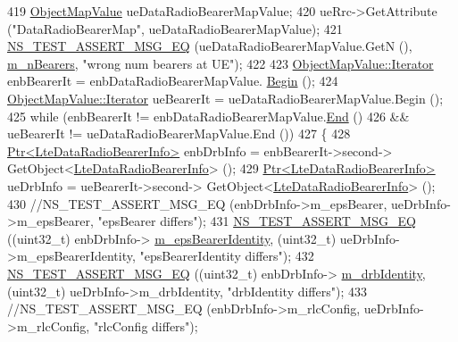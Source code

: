 \begin{DoxyCode}
419           \hyperlink{classns3_1_1ObjectPtrContainerValue}{ObjectMapValue} ueDataRadioBearerMapValue;
420           ueRrc->GetAttribute (\textcolor{stringliteral}{"DataRadioBearerMap"}, ueDataRadioBearerMapValue);
421           \hyperlink{group__testing_ga2a9d78cffb3db8e867c35fff0b698cf5}{NS\_TEST\_ASSERT\_MSG\_EQ} (ueDataRadioBearerMapValue.GetN (), 
      \hyperlink{classLteRrcConnectionEstablishmentTestCase_aed8d1feb0c1b557cd6685b17f3fa39f9}{m\_nBearers}, \textcolor{stringliteral}{"wrong num bearers at UE"});
422 
423           \hyperlink{classns3_1_1ObjectPtrContainerValue_a1f0661f9cf3626d62a4623f36b672876}{ObjectMapValue::Iterator} enbBearerIt = enbDataRadioBearerMapValue.
      \hyperlink{classns3_1_1ObjectPtrContainerValue_a2dd05c2e7483eb2eeeb0b2389f238815}{Begin} ();
424           \hyperlink{classns3_1_1ObjectPtrContainerValue_a1f0661f9cf3626d62a4623f36b672876}{ObjectMapValue::Iterator} ueBearerIt = ueDataRadioBearerMapValue.Begin ();
425           \textcolor{keywordflow}{while} (enbBearerIt != enbDataRadioBearerMapValue.\hyperlink{classns3_1_1ObjectPtrContainerValue_a45b7448cf99d2629260c21f740b904d0}{End} ()
426                  && ueBearerIt != ueDataRadioBearerMapValue.End ())
427             \{
428               \hyperlink{classns3_1_1Ptr}{Ptr<LteDataRadioBearerInfo>} enbDrbInfo = enbBearerIt->second->
      GetObject<\hyperlink{classns3_1_1LteDataRadioBearerInfo}{LteDataRadioBearerInfo}> ();
429               \hyperlink{classns3_1_1Ptr}{Ptr<LteDataRadioBearerInfo>} ueDrbInfo = ueBearerIt->second->
      GetObject<\hyperlink{classns3_1_1LteDataRadioBearerInfo}{LteDataRadioBearerInfo}> ();
430               \textcolor{comment}{//NS\_TEST\_ASSERT\_MSG\_EQ (enbDrbInfo->m\_epsBearer, ueDrbInfo->m\_epsBearer, "epsBearer
       differs");}
431               \hyperlink{group__testing_ga2a9d78cffb3db8e867c35fff0b698cf5}{NS\_TEST\_ASSERT\_MSG\_EQ} ((uint32\_t) enbDrbInfo->
      \hyperlink{classns3_1_1LteDataRadioBearerInfo_ac5ff2de272b88aab06d6a1c34955bc0e}{m\_epsBearerIdentity}, (uint32\_t) ueDrbInfo->m\_epsBearerIdentity, \textcolor{stringliteral}{"epsBearerIdentity
       differs"});
432               \hyperlink{group__testing_ga2a9d78cffb3db8e867c35fff0b698cf5}{NS\_TEST\_ASSERT\_MSG\_EQ} ((uint32\_t) enbDrbInfo->
      \hyperlink{classns3_1_1LteDataRadioBearerInfo_a1f5a7e5404b41179c7519e6bbb168de1}{m\_drbIdentity}, (uint32\_t) ueDrbInfo->m\_drbIdentity, \textcolor{stringliteral}{"drbIdentity differs"});
433               \textcolor{comment}{//NS\_TEST\_ASSERT\_MSG\_EQ (enbDrbInfo->m\_rlcConfig, ueDrbInfo->m\_rlcConfig, "rlcConfig
       differs");}

\end{DoxyCode}
